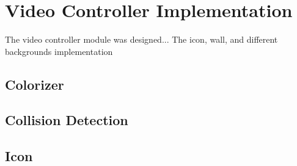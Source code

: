 \documentclass[11pt]{article}
\begin{document}
	
\section{Video Controller Implementation}
	The video controller module was designed...
	The icon, wall, and different backgrounds implementation
	
		
		\subsection{Colorizer}
		

%
		\subsection{Collision Detection}		
		
				
		\subsection{Icon}
		


\end{document}
